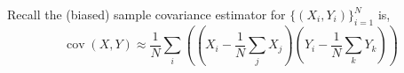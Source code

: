 \documentclass[letterpaper,11pt]{exam}
\DeclareMathOperator*{\cov}{cov}
\begin{document}
\begin{questions}
\begin{parts}
	\begin{tcolorbox}
	    Recall the (biased) sample covariance estimator for $\{(X_i, Y_i)\}_{i=1}^{N}$ is,
	\begin{equation}\label{eq:cov:est}
	\cov(X, Y) \approx \frac{1}{N}\sum_i 
	\left(
	    (X_i - \frac{1}{N}\sum_j X_j)
	    (Y_i - \frac{1}{N}\sum_k Y_k)
	\right)
	\end{equation}
	\end{tcolorbox}
\end{parts}
\end{questions}

\nocite{Simoncelli2004}
\nocite{Park2011c}
\nocite{Arribas2020a}
\nocite{Dowling2020a}


\end{document}
